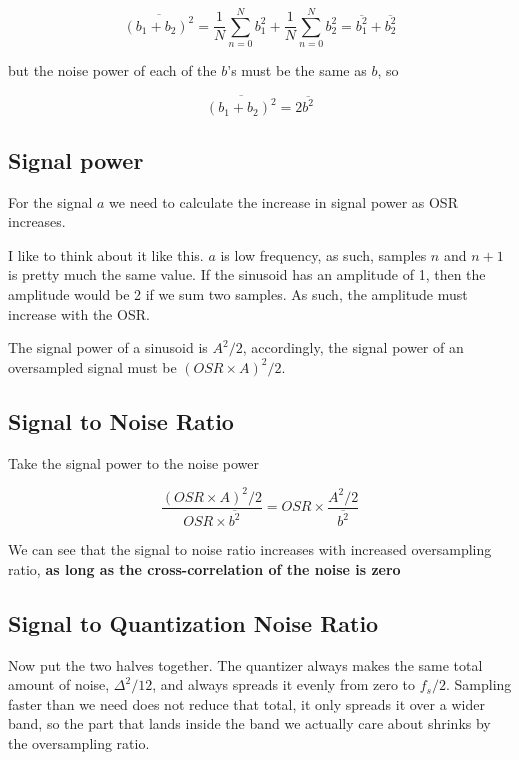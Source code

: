\[
\overline{(b_1 + b_2)^2} = \frac{1}{N}\sum_{n=0}^N{b_1^2} + \frac{1}{N}\sum_{n=0}^N{b_2^2} =  \overline{b_1^2} + \overline{b_2^2}
\]

but the noise power of each of the \(b\)'s must be the same as \(b\), so

\[
\overline{(b_1 + b_2)^2} = 2\overline{b^2}
\]

\subsection{Signal power}\label{signal-power}

For the signal \(a\) we need to calculate the increase in signal power
as OSR increases.

I like to think about it like this. \(a\) is low frequency, as such,
samples \(n\) and \(n+1\) is pretty much the same value. If the sinusoid
has an amplitude of 1, then the amplitude would be 2 if we sum two
samples. As such, the amplitude must increase with the OSR.

The signal power of a sinusoid is \(A^2/2\), accordingly, the signal
power of an oversampled signal must be \((OSR \times A)^2/2\).

\subsection{Signal to Noise Ratio}\label{signal-to-noise-ratio}

Take the signal power to the noise power

\[
\frac{(OSR \times A)^2/2}{OSR \times \overline{b^2}} = OSR \times \frac{A^2/2}{\overline{b^2}}
\]

We can see that the signal to noise ratio increases with increased
oversampling ratio, \textbf{as long as the cross-correlation of the
noise is zero}

\subsection{Signal to Quantization Noise
Ratio}\label{signal-to-quantization-noise-ratio-1}

Now put the two halves together. The quantizer always makes the same
total amount of noise, \(\Delta^2/12\), and always spreads it evenly
from zero to \(f_s/2\). Sampling faster than we need does not reduce
that total, it only spreads it over a wider band, so the part that lands
inside the band we actually care about shrinks by the oversampling
ratio.

